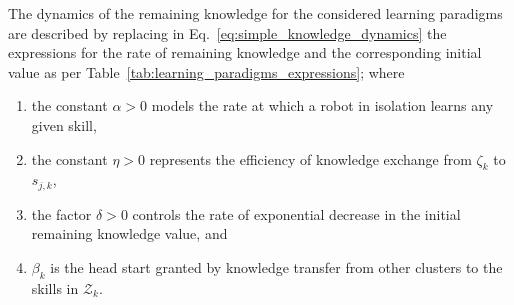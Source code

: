 \documentclass[12pt]{article}
\begin{document}
The dynamics of the remaining knowledge for the considered learning paradigms are described by replacing in Eq.~\eqref{eq:simple_knowledge_dynamics} the expressions for the rate of remaining knowledge and the corresponding initial value as per Table~\ref{tab:learning_paradigms_expressions}; where
\begin{enumerate}
	\item the constant $ \alpha>0$ models the rate at which a robot in isolation learns any given skill,
	\item the constant $\eta>0$ represents the efficiency of knowledge exchange from $\zeta_k$ to $s_{j,k}$,
	\item the factor $\delta>0$ controls the rate of exponential decrease in the initial remaining knowledge value, and
	\item $\beta_k$ is the head start granted by knowledge transfer from other clusters to the skills in $\mathcal{Z}_k$.
\end{enumerate}
\end{document}
